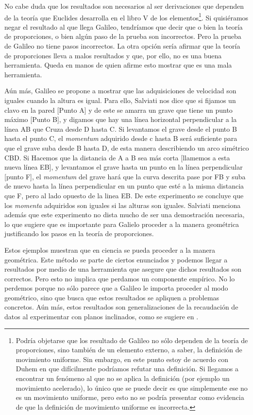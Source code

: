 No cabe duda que los resultados son necesarios al ser derivaciones que dependen de la teoría que Euclides desarrolla en el libro V de los elementos\footnote{Podría objetarse que los resultado de Galileo no sólo dependen de la teoría de proporciones, sino también de un elemento externo, a saber, la definición de movimiento uniforme. Sin embargo, en este punto estoy de acuerdo con Duhem \cite{Duhem1976} en que difícilmente podríamos refutar una definición. Si llegamos a encontrar un fenómeno al que no se aplica la definición (por ejemplo un movimiento acelerado), lo único que se puede decir es que simplemente ese no es un movimiento uniforme, pero esto no se podría presentar como evidencia de que la definición de movimiento uniforme es incorrecta.}. Si quisiéramos negar el resultado al que llega Galileo, tendríamos que decir que o bien la teoría de proporciones, o bien algún paso de la prueba son incorrectos. Pero la prueba de Galileo no tiene pasos incorrectos. La otra opción sería afirmar que la teoría de proporciones lleva a malos resultados y que, por ello, no es una buena herramienta. Queda en manos de quien afirme esto mostrar que es una mala herramienta.

Aún más, Galileo se propone a mostrar que las adquisiciones de velocidad son iguales cuando la altura es igual. Para ello, Salviati \cite[p. 232]{galtre} nos dice que si fijamos un clavo en la pared [Punto A] y de este se amarra un grave que tiene un punto máximo [Punto B], y digamos que hay una línea horizontal perpendicular a la línea AB que Cruza desde D hasta C. Si levantamos el grave desde el punto B hasta el punto C, el \textit{momentum} adquirido desde c hasta B será suficiente para que el grave suba desde B hasta D, de esta manera describiendo un arco simétrico CBD. Si Hacemos que la distancia de A a B sea más corta [llamemos a esta nueva línea EB], y levantamos el grave hasta un punto en la línea perpendicular [punto F], el \textit{momentum} del grave hará que la curva descrita pase por FB y suba de nuevo hasta la línea perpendicular en un punto que esté a la misma distancia que F, pero al lado opuesto de la linea EB. De este experimento se concluye que los \textit{momenta} adquiridos son iguales si las alturas son iguales. Salviati menciona además que este experimento no dista mucho de ser una demostración necesaria, lo que sugiere que es importante para Galielo proceder a la manera geométrica justificando los pasos en la teoría de proporciones.

Estos ejemplos muestran que en ciencia se pueda proceder a la manera geométrica. Este método se parte de ciertos enunciados y podemos llegar a resultados por medio de una herramienta que asegure que dichos resultados son correctos. Pero esto no implica que perdamos un componente empírico. No lo perdemos porque no sólo parece que a Galileo le importa proceder al modo geométrico, sino que busca que estos resultados se apliquen a problemas concretos. Aún más, estos resultados son generalizaciones de la recaudación de datos al experimentar con planos inclinados, como se sugiere en \cite[p. 231]{galtre}.


